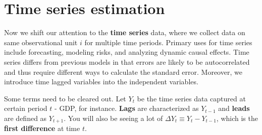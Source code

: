 \documentclass[12pt]{article}
\theoremstyle{definition}
\theoremstyle{property}
\theoremstyle{assumption}
\theoremstyle{example}
\theoremstyle{comment}
\begin{document}
\section{Time series estimation}
Now we shift our attention to the \textbf{time series} data, where we collect data on same observational unit $i$ for multiple time periods. Primary uses for time series include forecasting, modeling risks, and analyzing dynamic causal effects. Time series differs from previous models in that errors are likely to be autocorrelated and thus require different ways to calculate the standard error. Moreover, we introduce time lagged variables into the independent variables.
\par\medskip
Some terms need to be cleared out. Let $Y_t$ be the time series data captured at certain period $t$ - GDP, for instance. \textbf{Lags} are characterized as $Y_{t-1}$ and \textbf{leads} are defined as $Y_{t+1}$. You will also be seeing a lot of $\Delta Y_{t}\equiv Y_t-Y_{t-1}$, which is the \textbf{first difference} at time $t$. 
\par\medskip
\end{document}
